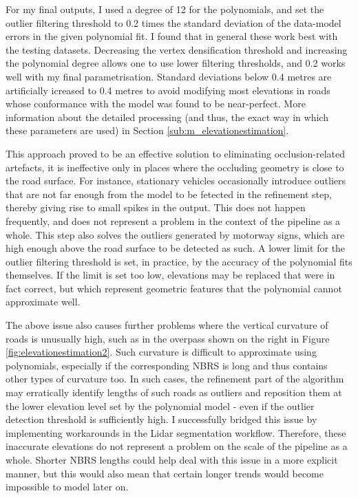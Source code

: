 For my final outputs, I used a degree of 12 for the polynomials, and set the outlier filtering threshold to 0.2 times the standard deviation of the data-model errors in the given polynomial fit. I found that in general these work best with the testing datasets. Decreasing the vertex densification threshold and increasing the polynomial degree allows one to use lower filtering thresholds, and 0.2 works well with my final parametrisation. Standard deviations below 0.4 metres are artificially icreased to 0.4 metres to avoid modifying most elevations in roads whose conformance with the model was found to be near-perfect. More information about the detailed processing (and thus, the exact way in which these parameters are used) in Section \ref{sub:m_elevationestimation}.

This approach proved to be an effective solution to eliminating occlusion-related artefacts, it is ineffective only in places where the occluding geometry is close to the road surface. For instance, stationary vehicles occasionally introduce outliers that are not far enough from the model to be fetected in the refinement step, thereby giving rise to small spikes in the output. This does not happen frequently, and does not represent a problem in the context of the pipeline as a whole. This step also solves the outliers generated by motorway signs, which are high enough above the road surface to be detected as such. A lower limit for the outlier filtering threshold is set, in practice, by the accuracy of the polynomial fits themselves. If the limit is set too low, elevations may be replaced that were in fact correct, but which represent geometric features that the polynomial cannot approximate well.

The above issue also causes further problems where the vertical curvature of roads is unusually high, such as in the overpass shown on the right in Figure \ref{fig:elevationestimation2}. Such curvature is difficult to approximate using polynomials, especially if the corresponding NBRS is long and thus contains other types of curvature too. In such cases, the refinement part of the algorithm may erratically identify lengths of such roads as outliers and reposition them at the lower elevation level set by the polynomial model - even if the outlier detection threshold is sufficiently high. I successfully bridged this issue by implementing workarounds in the Lidar segmentation workflow. Therefore, these inaccurate elevations do not represent a problem on the scale of the pipeline as a whole. Shorter NBRS lengths could help deal with this issue in a more explicit manner, but this would also mean that certain longer trends would become impossible to model later on.


